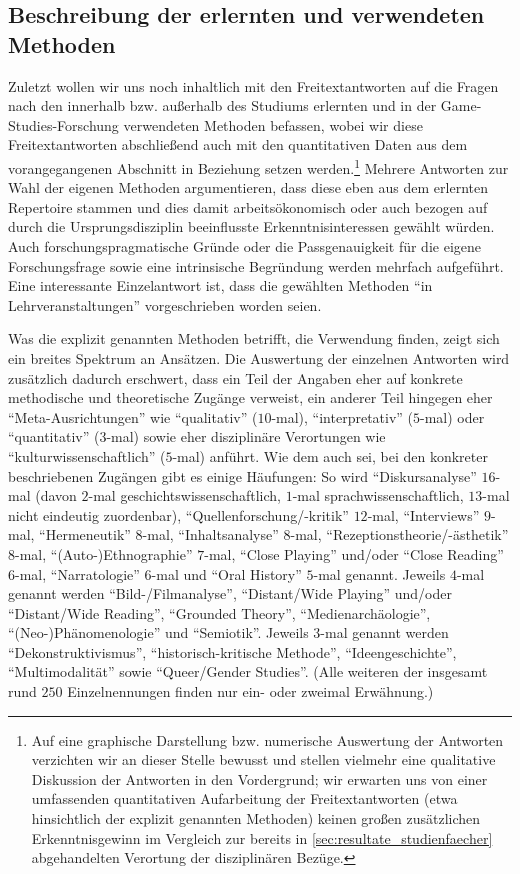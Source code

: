 \documentclass{scrartcl}
\begin{document}
\subsection{Beschreibung der erlernten und verwendeten Methoden}\label{sec:resultate_methoden}
Zuletzt wollen wir uns noch inhaltlich mit den Freitextantworten auf die Fragen nach den innerhalb bzw. außerhalb des Studiums erlernten und in der Game-Studies-Forschung verwendeten Methoden befassen, wobei wir diese Freitextantworten abschließend auch mit den quantitativen Daten aus dem vorangegangenen Abschnitt in Beziehung setzen werden.\footnote{Auf eine graphische Darstellung bzw. numerische Auswertung der Antworten verzichten wir an dieser Stelle bewusst und stellen vielmehr eine qualitative Diskussion der Antworten in den Vordergrund; wir erwarten uns von einer umfassenden quantitativen Aufarbeitung der Freitextantworten (etwa hinsichtlich der explizit genannten Methoden) keinen großen zusätzlichen Erkenntnisgewinn im Vergleich zur bereits in \autoref{sec:resultate_studienfaecher} abgehandelten Verortung der disziplinären Bezüge.}
Mehrere Antworten zur Wahl der eigenen Methoden argumentieren, dass diese eben aus dem erlernten Repertoire stammen und dies damit arbeitsökonomisch oder auch bezogen auf durch die Ursprungsdisziplin beeinflusste Erkenntnisinteressen gewählt würden.
Auch forschungspragmatische Gründe oder die Passgenauigkeit für die eigene Forschungsfrage sowie eine intrinsische Begründung werden mehrfach aufgeführt.
Eine interessante Einzelantwort ist, dass die gewählten Methoden \enquote{in Lehrveranstaltungen} vorgeschrieben worden seien.

Was die explizit genannten Methoden betrifft, die Verwendung finden, zeigt sich ein breites Spektrum an Ansätzen.
Die Auswertung der einzelnen Antworten wird zusätzlich dadurch erschwert, dass ein Teil der Angaben eher auf konkrete methodische und theoretische Zugänge verweist, ein anderer Teil hingegen eher \enquote{Meta-Ausrichtungen} wie \enquote{qualitativ} ($10$-mal), \enquote{interpretativ} ($5$-mal) oder \enquote{quantitativ} ($3$-mal) sowie eher disziplinäre Verortungen wie \enquote{kulturwissenschaftlich} ($5$-mal) anführt.
Wie dem auch sei, bei den konkreter beschriebenen Zugängen gibt es einige Häufungen:
So wird \enquote{Diskursanalyse} $16$-mal (davon $2$-mal geschichtswissenschaftlich, $1$-mal sprachwissenschaftlich, $13$-mal nicht eindeutig zuordenbar), \enquote{Quellenforschung/-kritik} $12$-mal, \enquote{Interviews} $9$-mal, \enquote{Hermeneutik} $8$-mal, \enquote{Inhaltsanalyse} $8$-mal, \enquote{Rezeptionstheorie/-ästhetik} $8$-mal, \enquote{(Auto-)Ethnographie} $7$-mal, \enquote{Close Playing} und/oder \enquote{Close Reading} $6$-mal, \enquote{Narratologie} $6$-mal und \enquote{Oral History} $5$-mal genannt.
Jeweils $4$-mal genannt werden \enquote{Bild-/Filmanalyse}, \enquote{Distant/Wide Playing} und/oder \enquote{Distant/Wide Reading}, \enquote{Grounded Theory}, \enquote{Medienarchäologie}, \enquote{(Neo-)Phänomenologie} und \enquote{Semiotik}.
Jeweils $3$-mal genannt werden \enquote{Dekonstruktivismus}, \enquote{historisch-kritische Methode}, \enquote{Ideengeschichte}, \enquote{Multimodalität} sowie \enquote{Queer/Gender Studies}.
(Alle weiteren der insgesamt rund $250$ Einzelnennungen finden nur ein- oder zweimal Erwähnung.)
\end{document}
